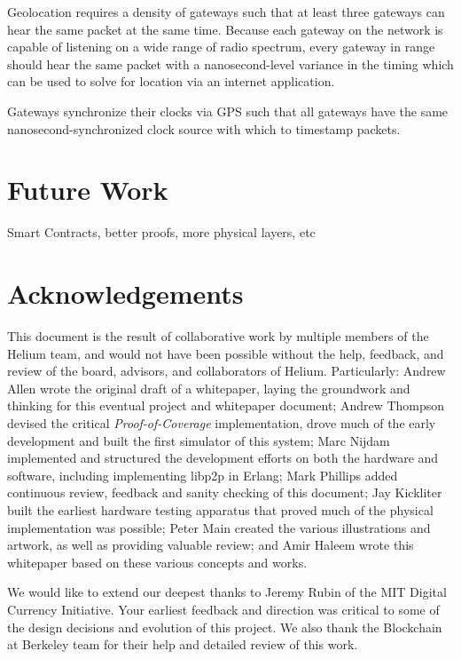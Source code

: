 \documentclass[letterpaper,11pt]{article}
\def\proofofcoverage/{\textit{Proof-of-Coverage}}
\begin{document}
Geolocation requires a density of gateways such that at least three gateways can hear the same packet at the same time. Because each gateway on the network is capable of listening on a wide range of radio spectrum, every gateway in range should hear the same packet with a nanosecond-level variance in the timing which can be used to solve for location via an internet application.\newline

Gateways synchronize their clocks via GPS such that all gateways have the same nanosecond-synchronized clock source with which to timestamp packets.

\newpage

\section{Future Work}

Smart Contracts, better proofs, more physical layers, etc

\newpage

\section{Acknowledgements}

This document is the result of collaborative work by multiple members of the Helium team, and would not have been possible without the help, feedback, and review of the board, advisors, and collaborators of Helium. Particularly: Andrew Allen wrote the original draft of a whitepaper, laying the groundwork and thinking for this eventual project and whitepaper document; Andrew Thompson devised the critical \proofofcoverage/ implementation, drove much of the early development and built the first simulator of this system; Marc Nijdam implemented and structured the development efforts on both the hardware and software, including implementing libp2p in Erlang; Mark Phillips added continuous review, feedback and sanity checking of this document; Jay Kickliter built the earliest hardware testing apparatus that proved much of the physical implementation was possible; Peter Main created the various illustrations and artwork, as well as providing valuable review; and Amir Haleem wrote this whitepaper based on these various concepts and works.\newline

We would like to extend our deepest thanks to Jeremy Rubin of the MIT Digital Currency Initiative. Your earliest feedback and direction was critical to some of the design decisions and evolution of this project. We also thank the Blockchain at Berkeley team for their help and detailed review of this work.\newline
\end{document}
